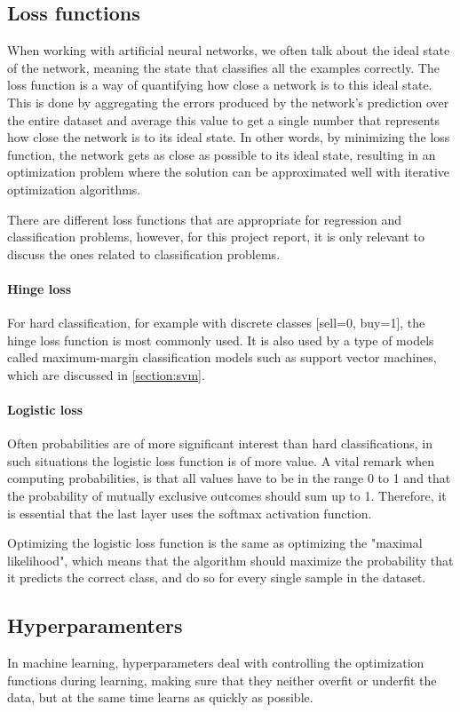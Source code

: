 \subsection{Loss functions}
When working with artificial neural networks, we often talk about the ideal state of the network, meaning the state that classifies all the examples correctly. The loss function is a way of quantifying how close a network is to this ideal state. This is done by aggregating the errors produced by the network's prediction over the entire dataset and average this value to get a single number that represents how close the network is to its ideal state. In other words, by minimizing the loss function, the network gets as close as possible to its ideal state, resulting in an optimization problem where the solution can be approximated well with iterative optimization algorithms.

There are different loss functions that are appropriate for regression and classification problems, however, for this project report, it is only relevant to discuss the ones related to classification problems.

\paragraph{Hinge loss}
For hard classification, for example with discrete classes [sell=0, buy=1], the hinge loss function is most commonly used. It is also used by a type of models called maximum-margin classification models such as support vector machines, which are discussed in \autoref{section:svm}.

\paragraph{Logistic loss}
Often probabilities are of more significant interest than hard classifications, in such situations the logistic loss function is of more value. A vital remark when computing probabilities, is that all values have to be in the range 0 to 1 and that the probability of mutually exclusive outcomes should sum up to 1. Therefore, it is essential that the last layer uses the softmax activation function.

Optimizing the logistic loss function is the same as optimizing the "maximal likelihood", which means that the algorithm should maximize the probability that it predicts the correct class, and do so for every single sample in the dataset. 

\subsection{Hyperparamenters}\label{section:hyperparameters}
In machine learning, hyperparameters deal with controlling the optimization functions during learning, making sure that they neither overfit or underfit the data, but at the same time learns as quickly as possible.

